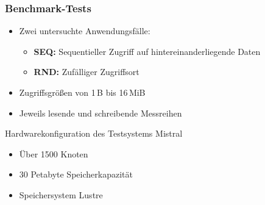 \documentclass{beamer}
\begin{document}
\begin{frame}
\frametitle{Benchmark-Tests}
\begin{itemize}
	\item Zwei untersuchte Anwendungsfälle:
	\begin{itemize}
		\item \textbf{SEQ:} Sequentieller Zugriff auf hintereinanderliegende Daten
		\item \textbf{RND:} Zufälliger Zugriffsort 
	\end{itemize}
	\item Zugriffsgrößen von 1\,B bis 16\,MiB
	\item Jeweils lesende und schreibende Messreihen
	
\end{itemize}
	\begin{block}{Hardwarekonfiguration des Testsystems Mistral}
	\begin{itemize} 
		\item Über 1500 Knoten
		\item 30 Petabyte Speicherkapazität
		\item Speichersystem Lustre
	\end{itemize}
\end{block}
\end{frame}
\end{document}
